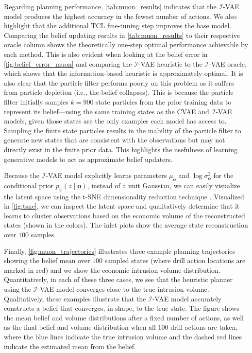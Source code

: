Regarding planning performance, \cref{tab:muon_results} indicates that the $\mathcal{I}$-VAE model produces the highest accuracy in the fewest number of actions.
We also highlight that the additional TCL fine-tuning step improves the base model.
Comparing the belief updating results in \cref{tab:muon_results} to their respective oracle column shows the theoretically one-step optimal performance achievable by each method.
This is also evident when looking at the belief error in \cref{fig:belief_error_muon} and comparing the $\mathcal{I}$-VAE heuristic to the $\mathcal{I}$-VAE oracle, which shows that the information-based heuristic is approximately optimal.
It is also clear that the particle filter performs poorly on this problem as it suffers from particle depletion (i.e., the belief collapses).
This is because the particle filter initially samples $k = 900$ state particles from the prior training data to represent its belief---using the same training states as the CVAE and $\mathcal{I}$-VAE models, given those states are the only examples each model has access to.
Sampling the finite state particles results in the inability of the particle filter to generate new states that are consistent with the observations but may not directly exist in the finite prior data.
This highlights the usefulness of learning generative models to act as approximate belief updaters.

Because the $\mathcal{I}$-VAE model explicitly learns parameters $\mu_\mathbf{o}$ and $\log \sigma^2_\mathbf{o}$ for the conditional prior $p_\psi(z \mid \mathbf{o})$, instead of a unit Gaussian, we can easily visualize the latent space using the t-SNE dimensionality reduction technique \cite{platzer2013visualization}.
Visualized in \cref{fig:tsne}, we can inspect the latent space and qualitatively determine that it learns to cluster observations based on the economic volume of the reconstructed states (shown in the colors).
The inlet plots show the average state reconstruction over $100$ samples.

Finally, \cref{fig:muon_trajectories} illustrates three example planning trajectories showing the belief mean over $100$ sampled states (where drill action locations are marked in red) and we show the economic intrusion volume distribution.
Quantitatively, in each of these three cases, we see that the heuristic planner using the $\mathcal{I}$-VAE model converges close to the true intrusion volume.
Qualitatively, these examples illustrate that the $\mathcal{I}$-VAE model accurately constructs a belief that converges, in shape, to the true state.
The figure shows the mean belief and volume distributions after a fixed number of actions, as well as the final belief and volume distribution when all $100$ drill actions are taken, where the blue lines indicate the true intrusion volume and the dashed red lines indicate the estimated mean from the belief.


